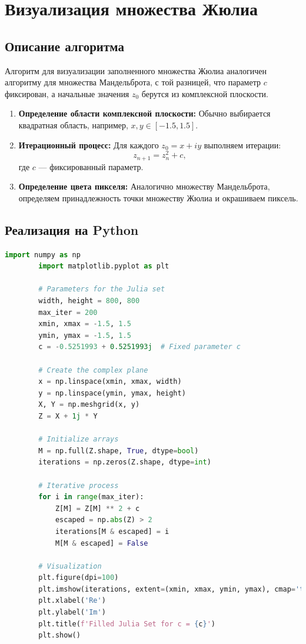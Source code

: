 \documentclass{article}
\begin{document}
	\newpage
	
	\section{Визуализация множества Жюлиа}
	
	\subsection{Описание алгоритма}
	Алгоритм для визуализации заполненного множества Жюлиа аналогичен алгоритму для множества Мандельброта, с той разницей, что параметр $c$ фиксирован, а начальные значения $z_0$ берутся из комплексной плоскости.
	
	\begin{enumerate}
		\item \textbf{Определение области комплексной плоскости:} Обычно выбирается квадратная область, например, $x, y \in [-1.5, 1.5]$.
		\item \textbf{Итерационный процесс:} Для каждого $z_0 = x + iy$ выполняем итерации:
		\begin{equation}
			z_{n+1} = z_n^2 + c,
		\end{equation}
		где $c$ — фиксированный параметр.
		\item \textbf{Определение цвета пикселя:} Аналогично множеству Мандельброта, определяем принадлежность точки множеству Жюлиа и окрашиваем пиксель.
	\end{enumerate}
	
	\subsection{Реализация на Python}
	
	\begin{lstlisting}[language=Python, inputencoding=utf8]
		import numpy as np
		import matplotlib.pyplot as plt
		
		# Parameters for the Julia set
		width, height = 800, 800
		max_iter = 200
		xmin, xmax = -1.5, 1.5
		ymin, ymax = -1.5, 1.5
		c = -0.5251993 + 0.5251993j  # Fixed parameter c
		
		# Create the complex plane
		x = np.linspace(xmin, xmax, width)
		y = np.linspace(ymin, ymax, height)
		X, Y = np.meshgrid(x, y)
		Z = X + 1j * Y
		
		# Initialize arrays
		M = np.full(Z.shape, True, dtype=bool)
		iterations = np.zeros(Z.shape, dtype=int)
		
		# Iterative process
		for i in range(max_iter):
			Z[M] = Z[M] ** 2 + c
			escaped = np.abs(Z) > 2
			iterations[M & escaped] = i
			M[M & escaped] = False
		
		# Visualization
		plt.figure(dpi=100)
		plt.imshow(iterations, extent=(xmin, xmax, ymin, ymax), cmap='twilight_shifted')
		plt.xlabel('Re')
		plt.ylabel('Im')
		plt.title(f'Filled Julia Set for c = {c}')
		plt.show()
	\end{lstlisting}
	
\end{document}
